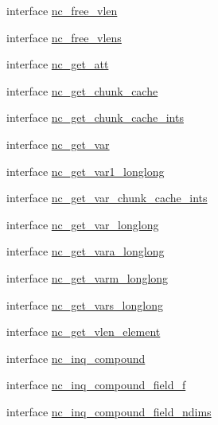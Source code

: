 \begin{DoxyCompactItemize}
\item 
interface \hyperlink{interfacenetcdf4__nc__interfaces_1_1nc__free__vlen}{nc\+\_\+free\+\_\+vlen}
\item 
interface \hyperlink{interfacenetcdf4__nc__interfaces_1_1nc__free__vlens}{nc\+\_\+free\+\_\+vlens}
\item 
interface \hyperlink{interfacenetcdf4__nc__interfaces_1_1nc__get__att}{nc\+\_\+get\+\_\+att}
\item 
interface \hyperlink{interfacenetcdf4__nc__interfaces_1_1nc__get__chunk__cache}{nc\+\_\+get\+\_\+chunk\+\_\+cache}
\item 
interface \hyperlink{interfacenetcdf4__nc__interfaces_1_1nc__get__chunk__cache__ints}{nc\+\_\+get\+\_\+chunk\+\_\+cache\+\_\+ints}
\item 
interface \hyperlink{interfacenetcdf4__nc__interfaces_1_1nc__get__var}{nc\+\_\+get\+\_\+var}
\item 
interface \hyperlink{interfacenetcdf4__nc__interfaces_1_1nc__get__var1__longlong}{nc\+\_\+get\+\_\+var1\+\_\+longlong}
\item 
interface \hyperlink{interfacenetcdf4__nc__interfaces_1_1nc__get__var__chunk__cache__ints}{nc\+\_\+get\+\_\+var\+\_\+chunk\+\_\+cache\+\_\+ints}
\item 
interface \hyperlink{interfacenetcdf4__nc__interfaces_1_1nc__get__var__longlong}{nc\+\_\+get\+\_\+var\+\_\+longlong}
\item 
interface \hyperlink{interfacenetcdf4__nc__interfaces_1_1nc__get__vara__longlong}{nc\+\_\+get\+\_\+vara\+\_\+longlong}
\item 
interface \hyperlink{interfacenetcdf4__nc__interfaces_1_1nc__get__varm__longlong}{nc\+\_\+get\+\_\+varm\+\_\+longlong}
\item 
interface \hyperlink{interfacenetcdf4__nc__interfaces_1_1nc__get__vars__longlong}{nc\+\_\+get\+\_\+vars\+\_\+longlong}
\item 
interface \hyperlink{interfacenetcdf4__nc__interfaces_1_1nc__get__vlen__element}{nc\+\_\+get\+\_\+vlen\+\_\+element}
\item 
interface \hyperlink{interfacenetcdf4__nc__interfaces_1_1nc__inq__compound}{nc\+\_\+inq\+\_\+compound}
\item 
interface \hyperlink{interfacenetcdf4__nc__interfaces_1_1nc__inq__compound__field__f}{nc\+\_\+inq\+\_\+compound\+\_\+field\+\_\+f}
\item 
interface \hyperlink{interfacenetcdf4__nc__interfaces_1_1nc__inq__compound__field__ndims}{nc\+\_\+inq\+\_\+compound\+\_\+field\+\_\+ndims}

\end{DoxyCompactItemize}
